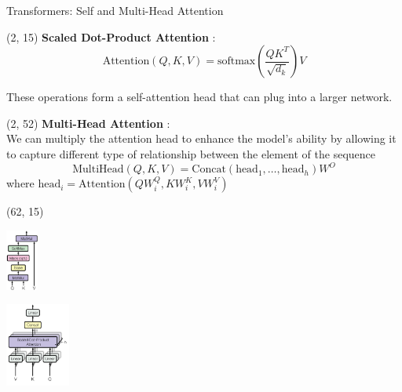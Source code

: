 \begin{frame}{Transformers: Self and Multi-Head Attention}
  \begin{textblock}{60}(2, 15)
    \textbf{Scaled Dot-Product Attention} : \\  
    
    \[
    \text{Attention}(Q, K, V) = \text{softmax}\left(\frac{QK^T}{\sqrt{d_k}}\right)V
    \]

    These operations form a self-attention head that can plug into a larger network.\\ 
  \end{textblock}
  \begin{textblock}{60}(2, 52)
    \textbf{Multi-Head Attention} : \\
    We can multiply the attention head to enhance the model's ability by allowing it to capture different type of relationship between the element of the sequence
    \[
    \text{MultiHead}(Q, K, V) = \text{Concat}(\text{head}_1, \ldots, \text{head}_h)W^O
    \]
    where $\text{head}_i = \text{Attention}(QW_i^Q, KW_i^K, VW_i^V)$
  \end{textblock}

  \begin{textblock}{38}(62, 15)
    \begin{center}\includegraphics[width=40px]{img/transformer_10.png}\end{center}
    \begin{center}\includegraphics[width=80px]{img/transformer_11.png}\end{center}
  \end{textblock}

\end{frame}



